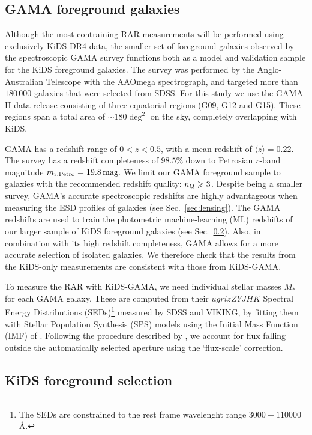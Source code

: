 \documentclass[usenatbib]{mnras}
\newcommand{\magn}{\, {\rm mag} }
\newcommand*{\meanb}[1]{\langle{#1}\rangle}
\newcommand{\un}[1]{_{\rm #1}}
\begin{document}
\subsection{GAMA foreground galaxies}
\label{sec:gama}

Although the most contraining RAR measurements will be performed using exclusively KiDS-DR4 data, the smaller set of foreground galaxies observed by the spectroscopic GAMA survey \cite[]{driver2011} functions both as a model and validation sample for the KiDS foreground galaxies. The survey was performed by the Anglo-Australian Telescope with the AAOmega spectrograph, and targeted more than $180 \, 000$ galaxies that were selected from SDSS. For this study we use the GAMA II data release \cite[]{liske2015} consisting of three equatorial regions (G09, G12 and G15). These regions span a total area of $\sim180 \deg^2$ on the sky, completely overlapping with KiDS.

GAMA has a redshift range of $0<z<0.5$, with a mean redshift of $\meanb{z}=0.22$. The survey has a redshift completeness of $98.5\%$ down to Petrosian $r$-band magnitude $m\un{r,Petro} = 19.8 \magn$. We limit our GAMA foreground sample to galaxies with the recommended redshift quality: $n\un{Q}\geq3$. Despite being a smaller survey, GAMA's accurate spectroscopic redshifts are highly advantageous when measuring the ESD profiles of galaxies (see Sec.~\ref{sec:lensing}). The GAMA redshifts are used to train the photometric machine-learning (ML) redshifts of our larger sample of KiDS foreground galaxies (see Sec.~\ref{sec:gamalike_kids}). Also, in combination with its high redshift completeness, GAMA allows for a more accurate selection of isolated galaxies. We therefore check that the results from the KiDS-only measurements are consistent with those from KiDS-GAMA.

To measure the RAR with KiDS-GAMA, we need individual stellar masses $M_*$ for each GAMA galaxy. These are computed from their $ugrizZYJHK$ Spectral Energy Distributions (SEDs)\footnote{The SEDs are constrained to the rest frame wavelenght range $3000-110000$ \AA.} measured by SDSS and VIKING, by fitting them with \cite{bruzual2003} Stellar Population Synthesis (SPS) models using the Initial Mass Function (IMF) of \cite{chabrier2003}. Following the procedure described by \cite{taylor2011}, we account for flux falling outside the automatically selected aperture using the `flux-scale' correction.

\subsection{KiDS foreground selection}
\label{sec:gamalike_kids}
\end{document}
